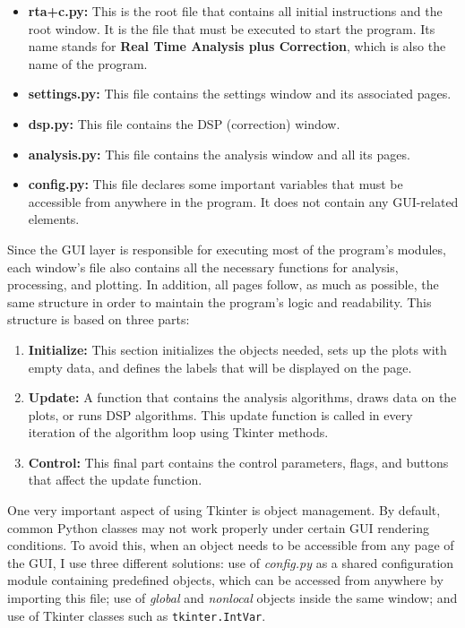 \begin{itemize}
	\item \textbf{rta+c.py:} This is the root file that contains all initial instructions and the root window. It is the file that must be executed to start the program. Its name stands for \textbf{Real Time Analysis plus Correction}, which is also the name of the program.
	\item \textbf{settings.py:} This file contains the settings window and its associated pages.
	\item \textbf{dsp.py:} This file contains the DSP (correction) window.
	\item \textbf{analysis.py:} This file contains the analysis window and all its pages.
	\item \textbf{config.py:} This file declares some important variables that must be accessible from anywhere in the program. It does not contain any GUI-related elements.
\end{itemize}

Since the GUI layer is responsible for executing most of the program’s modules, each window’s file also contains all the necessary functions for analysis, processing, and plotting. In addition, all pages follow, as much as possible, the same structure in order to maintain the program’s logic and readability. This structure is based on three parts:

\begin{enumerate}
	\item \textbf{Initialize:} This section initializes the objects needed, sets up the plots with empty data, and defines the labels that will be displayed on the page.
	\item \textbf{Update:} A function that contains the analysis algorithms, draws data on the plots, or runs DSP algorithms. This update function is called in every iteration of the algorithm loop using Tkinter methods.
	\item \textbf{Control:} This final part contains the control parameters, flags, and buttons that affect the update function.
\end{enumerate}

One very important aspect of using Tkinter is object management. By default, common Python classes may not work properly under certain GUI rendering conditions. To avoid this, when an object needs to be accessible from any page of the GUI, I use three different solutions: use of \textit{config.py} as a shared configuration module containing predefined objects, which can be accessed from anywhere by importing this file; use of \textit{global} and \textit{nonlocal} objects inside the same window; and use of Tkinter classes such as \texttt{tkinter.IntVar}.

